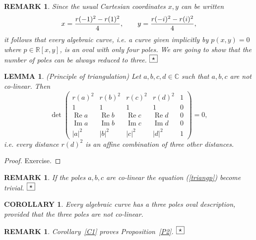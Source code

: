 \documentclass[10pt,a4paper,reqno]{amsart}
\newtheorem{lm}[defi]{\bf L\scriptsize EMMA \normalsize}
\newtheorem{dk}[defi]{\bf C\scriptsize OROLLARY \normalsize}
\newtheorem{rem}[defi]{\bf R\scriptsize EMARK \normalsize}
\def\kopr{\hfill\raisebox{3pt}{\framebox{$\star$}}}
\newenvironment{remark}{\begin{rem}\rm}{$\kopr$\end{rem}}
\newenvironment{lemma}{\begin{lm}\it}{\end{lm}}
\newenvironment{corollary}{\begin{dk}\it}{\end{dk}}
\newcommand{\zav}[1]{\left( #1 \right)}
\newcommand{\imag}{{\rm i}}
\renewcommand\Re{\operatorname{Re}}
\renewcommand\Im{\operatorname{Im}}
\newcommand{\deter}[1]{\det\zav{#1}}
\begin{document}
\begin{remark}
Since the usual Cartesian coordinates $x,y$ can be written
\begin{equation}\label{Cartesiantooval}
x=\frac{r(-1)^2-r(1)^2}{4},\qquad y=\frac{r(-\imag)^2-r(\imag)^2}{4},
\end{equation}
it follows that every algebraic curve, i.e. a curve given implicitly by $p(x,y)=0$ where $p\in\mathbb{R}[x,y]$, is an oval with only four poles. We are going to show that the number of poles can be always reduced to three.
\end{remark}

\begin{lemma} (Principle of triangulation)
Let $a,b,c,d\in\mathbb{C}$ such that $a,b,c$ are not co-linear. Then
\begin{equation}\label{triangp}
\deter{\begin{array}{ccccc}
r(a)^2 & r(b)^2 & r(c)^2 & r(d)^2 & 1 \\
1 & 1 & 1 & 1 & 0 \\
\Re a & \Re b & \Re c & \Re d & 0 \\
\Im a & \Im b & \Im c & \Im d & 0 \\
|a|^2 & |b|^2 & |c|^2 & |d|^2 & 1 
\end{array}}=0,
\end{equation}
i.e. every distance $r(d)^2$ is an affine combination of three other distances. 
\end{lemma}
\begin{proof}
Exercise.
\end{proof}
\begin{remark}
If the poles $a,b,c$ are co-linear the equation (\ref{triangp}) become trivial.
\end{remark}
\begin{corollary}\label{C1}
Every algebraic curve has a three poles oval description, provided that the three poles are not co-linear.
\end{corollary}
\begin{remark}
Corollary~\ref{C1} proves Proposition~\ref{P2}.
\end{remark}
\end{document}
